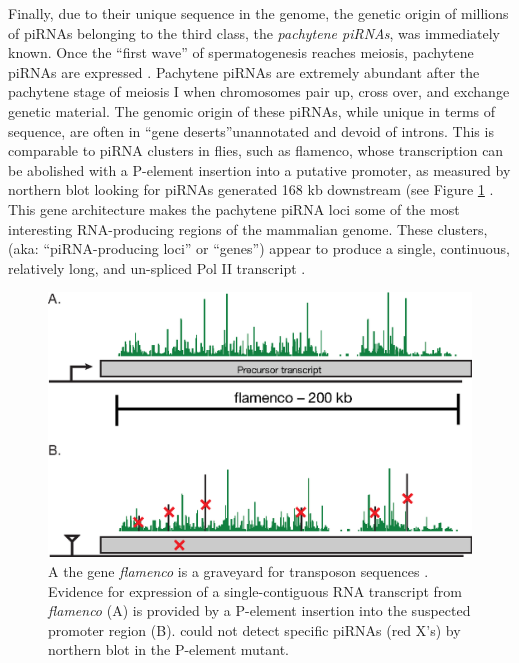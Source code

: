 {    Finally, due to their unique sequence in the genome, the genetic origin of millions of piRNAs belonging to the third class, the \textit{pachytene piRNAs}, was immediately known. Once the ``first wave'' of spermatogenesis \citep{Oakberg1956b, Laiho2013a} reaches meiosis, pachytene piRNAs are expressed \citep{Girard2006, Lau2006, Li2013h}. Pachytene piRNAs are extremely abundant after the pachytene stage of meiosis I when chromosomes pair up, cross over, and exchange genetic material. The genomic origin of these piRNAs, while unique in terms of sequence, are often in ``gene deserts''\textendash unannotated and devoid of introns. This is comparable to piRNA clusters in flies, such as flamenco, whose transcription can be abolished with a P-element insertion into a putative promoter, as measured by northern blot looking for piRNAs generated 168 kb downstream (see Figure \ref{Intro:fig:flamenco} \citep{Brennecke2007}. This gene architecture makes the pachytene piRNA loci some of the most interesting RNA-producing regions of the mammalian genome. These clusters, (aka: ``piRNA-producing loci'' or ``genes'') appear to produce a single, continuous, relatively long, and un-spliced Pol II transcript \citep{Li2013h}. 

    \begin{figure} %
      \centering 
      \includegraphics{Figures/Intro/FlamencoLocus.eps}
      \caption[Genetic evidence for long, continuous fly piRNA precursor transcripts]
      {
        A the \flies{} gene \textit{flamenco} is a graveyard for transposon sequences \citep{Pelisson1994}. Evidence for expression of a single-contiguous RNA transcript from \textit{flamenco} (A) is provided by a P-element insertion into the suspected promoter region (B). \citep{Brennecke2007} could not detect specific piRNAs (red X's) by northern blot in the P-element mutant.
        }
      \label{Intro:fig:flamenco}
      \end{figure}

}
